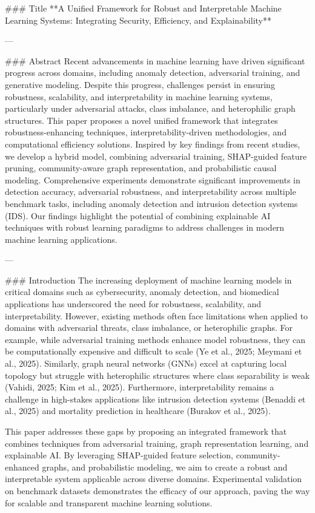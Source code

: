 ### Title  
**A Unified Framework for Robust and Interpretable Machine Learning Systems: Integrating Security, Efficiency, and Explainability**

---

### Abstract  
Recent advancements in machine learning have driven significant progress across domains, including anomaly detection, adversarial training, and generative modeling. Despite this progress, challenges persist in ensuring robustness, scalability, and interpretability in machine learning systems, particularly under adversarial attacks, class imbalance, and heterophilic graph structures. This paper proposes a novel unified framework that integrates robustness-enhancing techniques, interpretability-driven methodologies, and computational efficiency solutions. Inspired by key findings from recent studies, we develop a hybrid model, combining adversarial training, SHAP-guided feature pruning, community-aware graph representation, and probabilistic causal modeling. Comprehensive experiments demonstrate significant improvements in detection accuracy, adversarial robustness, and interpretability across multiple benchmark tasks, including anomaly detection and intrusion detection systems (IDS). Our findings highlight the potential of combining explainable AI techniques with robust learning paradigms to address challenges in modern machine learning applications.

---

### Introduction  
The increasing deployment of machine learning models in critical domains such as cybersecurity, anomaly detection, and biomedical applications has underscored the need for robustness, scalability, and interpretability. However, existing methods often face limitations when applied to domains with adversarial threats, class imbalance, or heterophilic graphs. For example, while adversarial training methods enhance model robustness, they can be computationally expensive and difficult to scale (Ye et al., 2025; Meymani et al., 2025). Similarly, graph neural networks (GNNs) excel at capturing local topology but struggle with heterophilic structures where class separability is weak (Vahidi, 2025; Kim et al., 2025). Furthermore, interpretability remains a challenge in high-stakes applications like intrusion detection systems (Benaddi et al., 2025) and mortality prediction in healthcare (Burakov et al., 2025).

This paper addresses these gaps by proposing an integrated framework that combines techniques from adversarial training, graph representation learning, and explainable AI. By leveraging SHAP-guided feature selection, community-enhanced graphs, and probabilistic modeling, we aim to create a robust and interpretable system applicable across diverse domains. Experimental validation on benchmark datasets demonstrates the efficacy of our approach, paving the way for scalable and transparent machine learning solutions.


